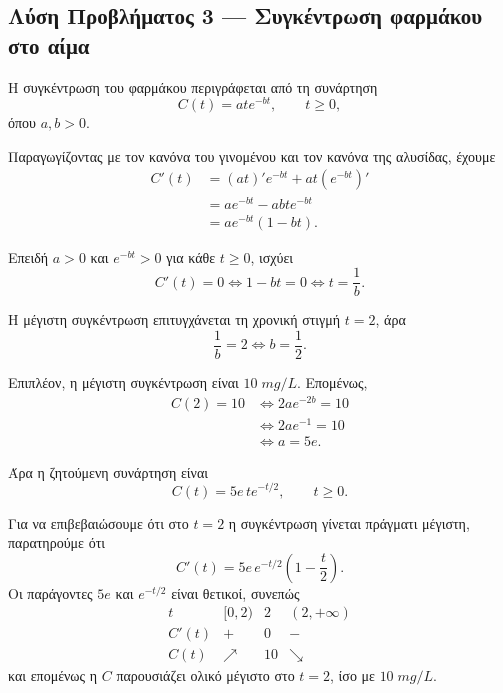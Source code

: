 \subsection*{Λύση Προβλήματος 3 --- Συγκέντρωση φαρμάκου στο αίμα}

Η συγκέντρωση του φαρμάκου περιγράφεται από τη συνάρτηση
\[
  C(t)=at e^{-bt},\qquad t\geq0,
\]
όπου $a,b>0$.

Παραγωγίζοντας με τον κανόνα του γινομένου και τον κανόνα της αλυσίδας,
έχουμε
\begin{align*}
  C'(t)
  &=(at)'e^{-bt}+at\left(e^{-bt}\right)'\\
  &=ae^{-bt}-ab t e^{-bt}\\
  &=ae^{-bt}(1-bt).
\end{align*}

Επειδή $a>0$ και $e^{-bt}>0$ για κάθε $t\geq0$, ισχύει
\[
  C'(t)=0
  \Longleftrightarrow
  1-bt=0
  \Longleftrightarrow
  t=\frac{1}{b}.
\]

Η μέγιστη συγκέντρωση επιτυγχάνεται τη χρονική στιγμή $t=2$, άρα
\[
  \frac{1}{b}=2
  \Longleftrightarrow
  {b=\frac12}.
\]

Επιπλέον, η μέγιστη συγκέντρωση είναι $10\;\si{mg/L}$. Επομένως,
\begin{align*}
  C(2)=10
  &\Longleftrightarrow
  2a e^{-2b}=10\\
  &\Longleftrightarrow
  2a e^{-1}=10\\
  &\Longleftrightarrow
  {a=5e}.
\end{align*}

Άρα η ζητούμενη συνάρτηση είναι
\[
  {C(t)=5e\,t e^{-t/2}},
  \qquad t\geq0.
\]

Για να επιβεβαιώσουμε ότι στο $t=2$ η συγκέντρωση γίνεται πράγματι
μέγιστη, παρατηρούμε ότι
\[
  C'(t)=5e\,e^{-t/2}\left(1-\frac{t}{2}\right).
\]
Οι παράγοντες $5e$ και $e^{-t/2}$ είναι θετικοί, συνεπώς
\[
\begin{array}{c|ccc}
  t & [0,2) & 2 & (2,+\infty)\\ \hline
  C'(t) & + & 0 & -\\
  C(t) & \nearrow & 10 & \searrow
\end{array}
\]
και επομένως η $C$ παρουσιάζει ολικό μέγιστο στο $t=2$, ίσο με
$10\;\si{mg/L}$.
